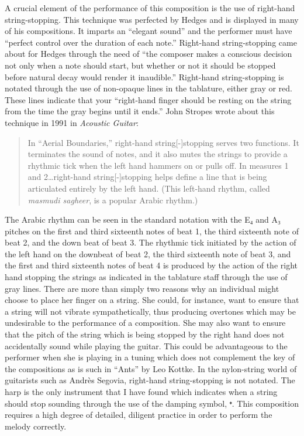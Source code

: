 \documentclass{tufte-handout}
\begin{document}
A crucial element of the performance of this composition is the use of right-hand string-stopping. This technique was perfected by Hedges and is displayed in many of his compositions. It imparts an ``elegant sound'' and the performer must have ``perfect control over the duration of each note.'' Right-hand string-stopping came about for Hedges through the need of ``the composer makes a conscious decision not only when a note should start, but whether or not it should be stopped before natural decay would render it inaudible.'' Right-hand string-stopping is notated through the use of non-opaque lines in the tablature, either gray or red. These lines indicate that your ``right-hand finger should be resting on the string from the time the gray begins until it ends.'' John Stropes wrote about this technique in 1991 in \emph{Acoustic Guitar}:
\begin{quote}
  In ``Aerial Boundaries,'' right-hand string[-]stopping serves two functions. It terminates the sound of notes, and it also mutes the strings to provide a rhythmic tick when the left hand hammers on or pulls off. In measures 1 and 2…right-hand string[-]stopping helps define a line that is being articulated entirely by the left hand. (This left-hand rhythm, called \emph{masmudi sagheer}, is a popular Arabic rhythm.)
\end{quote}
The Arabic rhythm can be seen in the standard notation with the E₄ and A₃ pitches on the first and third sixteenth notes of beat 1, the third sixteenth note of beat 2, and the down beat of beat 3. The rhythmic tick initiated by the action of the left hand on the downbeat of beat 2, the third sixteenth note of beat 3, and the first and third sixteenth notes of beat 4 is produced by the action of the right hand stopping the strings as indicated in the tablature staff through the use of gray lines.  There are more than simply two reasons why an individual might choose to place her finger on a string. She could, for instance, want to ensure that a string will not vibrate sympathetically, thus producing overtones which may be undesirable to the performance of a composition. She may also want to ensure that the pitch of the string which is being stopped by the right hand does not accidentally sound while playing the guitar. This could be advantageous to the performer when she is playing in a tuning which does not complement the key of the compositions as is such in ``Ants'' by Leo Kottke. In the nylon-string world of guitarists such as Andrès Segovia, right-hand string-stopping is not notated. The harp is the only instrument that I have found which indicates when a string should stop sounding through the use of the damping symbol, \texttt{{\huge𝄌}}.
This composition requires a high degree of detailed, diligent practice in order to perform the melody correctly.

 
\end{document}
